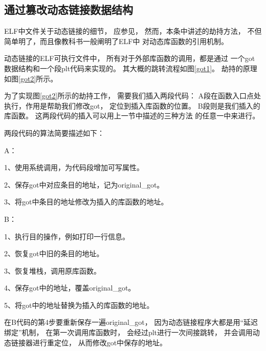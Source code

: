
\subsection{通过篡改动态链接数据结构}
\label{sub_plt}

ELF中文件关于动态链接的细节，
应参见\cite{elf1.2}，
然而，本条中讲述的劫持方法，
不但简单明了，而且像教科书一般阐明了ELF中
对动态库函数的引用机制。

动态链接的ELF可执行文件中，
所有对于外部库函数的调用，都是通过
一个got数据结构和一个段plt代码来实现的。
其大概的跳转流程如图\ref{got1}。
劫持的原理如图\ref{got2}所示。


为了实现图\ref{got2}所示的劫持工作，
需要我们插入两段代码：
A段在函数入口点处执行，作用是帮助我们修改got，
定位到插入库函数的位置。
B段则是我们插入的库函数。
这两段代码的插入可以用上一节中描述的三种方法
的任意一中来进行。

两段代码的算法简要描述如下：

A：

1、使用系统调用，为代码段增加可写属性。

2、保存got中对应条目的地址，记为original\_got。

3、将got中条目的地址修改为插入的库函数的地址。

B：

1、执行目的操作，例如打印一行信息。

2、恢复got中旧的条目的地址。

3、恢复堆栈，调用原库函数。

4、保存got中的地址，覆盖original\_got。

5、将got中的地址替换为插入的库函数的地址。

在B代码的第4步要重新保存一遍original\_got，
因为动态链接程序大都是用“延迟绑定”机制，
在第一次调用库函数时，
会经过plt进行一次间接跳转，
并会调用动态链接器进行重定位，
从而修改got中保存的地址。




















